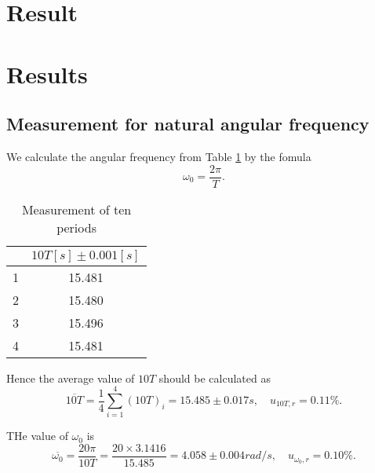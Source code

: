 \section{Result}



\section{Results}
\subsection{Measurement for natural angular frequency}
    We calculate the angular frequency from Table \ref{data_omega} by the fomula
    \[
        \omega_0=\frac{2\pi}{T}.
    \]
    \begin{table}[H] \small
        \centering
        \begin{tabular}{|c|c|}
        \hline
            & $10T[s] \pm 0.001[s]$\\\hline
            1 & 15.481\\\hline
            2 & 15.480\\\hline
            3 & 15.496\\\hline
            4 & 15.481\\\hline
        \end{tabular}
        \caption{Measurement of ten periods}\label{data_omega}
    \end{table}

    Hence the average value of $10T$ should be calculated as
    \[
        \overline{10T}=\frac{1}{4}\sum_{i=1}^{4}(10T)_i=15.485 \pm 0.017 s, \quad u_{10T,r}=0.11\%.
    \]

    THe value of $\omega_0$ is
    \[
        \overline{\omega_0}=\frac{20\pi}{10T}=\frac{20\times3.1416}{15.485}=4.058\pm 0.004rad/s,\quad u_{\omega_0,r}=0.10\%.
    \]

